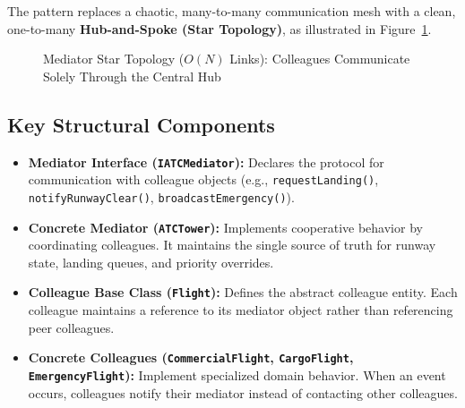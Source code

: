 \documentclass[12pt,a4paper]{article}
\begin{document}
The pattern replaces a chaotic, many-to-many communication mesh with a clean, one-to-many \textbf{Hub-and-Spoke (Star Topology)}, as illustrated in Figure~\ref{fig:star_topology}.

\begin{figure}[htbp]
\centering
{}
\caption{Mediator Star Topology ($O(N)$ Links): Colleagues Communicate Solely Through the Central Hub}
\label{fig:star_topology}
\end{figure}

\subsection{Key Structural Components}
\begin{itemize}
    \item \textbf{Mediator Interface (\texttt{IATCMediator}):} Declares the protocol for communication with colleague objects (e.g., \texttt{requestLanding()}, \texttt{notifyRunwayClear()}, \texttt{broadcastEmergency()}).
    \item \textbf{Concrete Mediator (\texttt{ATCTower}):} Implements cooperative behavior by coordinating colleagues. It maintains the single source of truth for runway state, landing queues, and priority overrides.
    \item \textbf{Colleague Base Class (\texttt{Flight}):} Defines the abstract colleague entity. Each colleague maintains a reference to its mediator object rather than referencing peer colleagues.
    \item \textbf{Concrete Colleagues (\texttt{CommercialFlight}, \texttt{CargoFlight}, \texttt{EmergencyFlight}):} Implement specialized domain behavior. When an event occurs, colleagues notify their mediator instead of contacting other colleagues.
\end{itemize}
\end{document}
